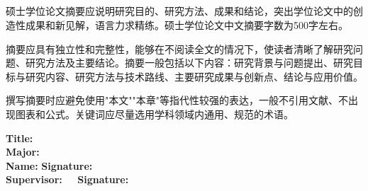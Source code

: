 

\begin{flushleft}
{\heiti
    \textbf{\the\CTitle}\\
    \textbf{\the\Cmajor}\\
    \textbf{\the\StudentAuthor}\hfill {}\thickuline{\quad\quad\quad\quad\quad\quad}\\
    \textbf{\the\Csupervisor~~\the\CsupervisorTitle}\hfill {}\thickuline{\quad\quad\quad\quad\quad\quad}\\
}
\end{flushleft}

\begin{cnabstract}
硕士学位论文摘要应说明研究目的、研究方法、成果和结论，突出学位论文中的创造性成果和新见解，语言力求精练。硕士学位论文中文摘要字数为500字左右。

摘要应具有独立性和完整性，能够在不阅读全文的情况下，使读者清晰了解研究问题、研究方法及主要结论。摘要一般包括以下内容：研究背景与问题提出、研究目标与研究内容、研究方法与技术路线、主要研究成果与创新点、结论与应用价值。

撰写摘要时应避免使用"本文""本章"等指代性较强的表达，一般不引用文献、不出现图表和公式。关键词应尽量选用学科领域内通用、规范的术语。

\par\vspace{\baselineskip}
\end{cnabstract}

\cleardoublepage %


\begin{flushleft}
{
\renewcommand{\baselinestretch}{1}
\textsf{\textbf{Title: \the\ETitle}\\
    \vspace*{14pt}
    \textbf{Major: \the\Emajor}\\
    \vspace*{14pt}
    \textbf{Name: \the\EStudentAuthor}\hfill \textbf{Signature:} \thickuline{\quad\quad\quad\quad\quad\quad}\\
    \vspace*{14pt}
    \textbf{Supervisor: \the\EsupervisorTitle~~\the\Esupervisor}\hfill \textbf{Signature:} \thickuline{\quad\quad\quad\quad\quad\quad}\\
}}
\end{flushleft}

